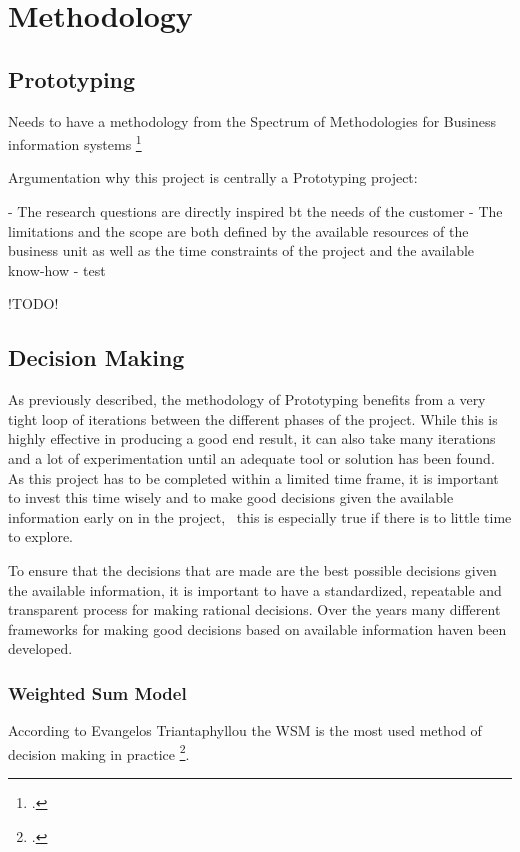 \chapter{Methodology}
\label{methodology}

\section{Prototyping}

Needs to have a methodology from the Spectrum of Methodologies for Business information systems \footcite{wildeMethodenspektrumWirtschaftsinformatikUeberblick}


Argumentation why this project is centrally a Prototyping project:

 - The research questions are directly inspired bt the needs of the customer
 - The limitations and the scope are both defined by the available resources of the business unit as well as the time constraints of the project
         and the available know-how
 -  test

 !TODO!



\newpage

\section{Decision Making}

As previously described, the methodology of Prototyping benefits from a very tight loop of iterations between the different phases of the project.
While this is highly effective in producing a good end result, it can also take many iterations and a lot of experimentation until an adequate tool or solution has been found.
As this project has to be completed within a limited time frame, it is important to invest this time wisely and to make good decisions given the available information early on in the project, \
this is especially true if there is to little time to explore.

To ensure that the decisions that are made are the best possible decisions given the available information, it is important to have a standardized, repeatable and transparent process for making rational decisions.
Over the years many different frameworks for making good decisions based on available information haven been developed.

\subsection{Weighted Sum Model}
According to Evangelos Triantaphyllou the \ac{WSM} is the most used method of decision making in practice \footcite[p. 1]{triantaphyllouIntroductionMultiCriteriaDecision2000}.

